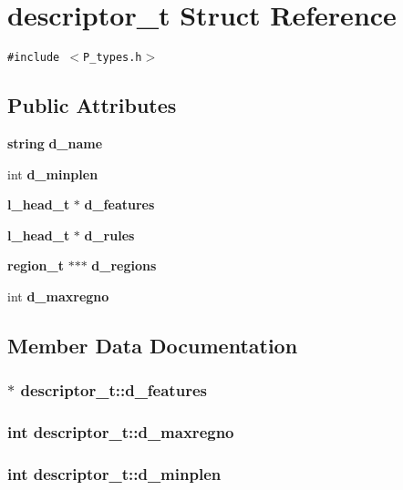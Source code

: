 \section{descriptor\_\-t  Struct Reference}
\label{structdescriptor__t}
{\tt \#include $<$P\_\-types.h$>$}

\subsection*{Public Attributes}
\begin{CompactItemize}
\item 
{\bf string} {\bf d\_\-name}
\item 
int {\bf d\_\-minplen}
\item 
{\bf l\_\-head\_\-t} $\ast$ {\bf d\_\-features}
\item 
{\bf l\_\-head\_\-t} $\ast$ {\bf d\_\-rules}
\item 
{\bf region\_\-t} $\ast$$\ast$$\ast$ {\bf d\_\-regions}
\item 
int {\bf d\_\-maxregno}
\end{CompactItemize}


\subsection{Member Data Documentation}
\subsubsection{$\ast$ descriptor\_\-t::d\_\-features}\label{structdescriptor__t_m2}


\subsubsection{\setlength{\rightskip}{0pt plus 5cm}int descriptor\_\-t::d\_\-maxregno}\label{structdescriptor__t_m5}


\subsubsection{\setlength{\rightskip}{0pt plus 5cm}int descriptor\_\-t::d\_\-minplen}\label{structdescriptor__t_m1}



